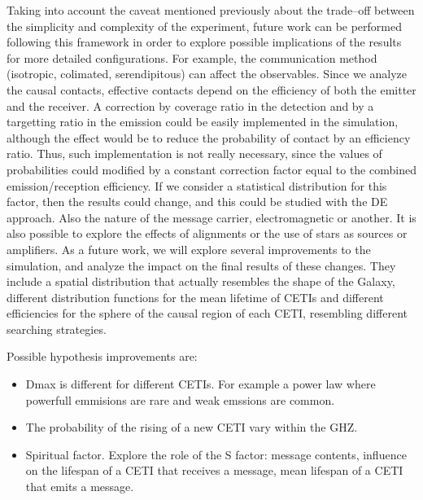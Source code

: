 \documentclass[crop]{CSLB}%
\begin{document}
Taking into account the caveat mentioned previously about the
trade--off between the simplicity and complexity of the experiment,
future work can be performed following this framework in order to
explore possible implications of the results for more detailed
configurations.
%
For example, the communication method (isotropic, colimated,
serendipitous) can affect the observables.
%
Since we analyze the causal contacts, effective contacts depend on the
efficiency of both the emitter and the receiver.
%
A correction by coverage ratio in the detection and by a targetting
ratio in the emission could be easily implemented in the simulation,
although the effect would be to reduce the probability of contact by
an efficiency ratio.
%
Thus, such implementation is not really necessary, since the values of
probabilities could modified by a constant correction factor equal to
the combined emission/reception efficiency.
%
If we consider a statistical distribution for this factor, then the
results could change, and this could be studied with the DE approach.
%
Also the nature of the message carrier, electromagnetic or another.
%
It is also possible to explore the effects of alignments or the use of
stars as sources or amplifiers.
%
%
As a future work, we will explore several improvements to the
simulation, and analyze the impact on the final results of these
changes.
%
They include a spatial distribution that actually resembles the shape
of the Galaxy, different distribution functions for the mean lifetime
of CETIs and different efficiencies for the sphere of the causal
region of each CETI, resembling different searching strategies.


Possible hypothesis improvements are:

\begin{itemize}
   \item Dmax is different for different CETIs.  For example a power
      law where powerfull emmisions are rare and weak emssions are
      common.
   \item The probability of the rising of a new CETI vary within the
      GHZ.
   \item Spiritual factor.  Explore the role of the S factor: message
      contents, influence on the lifespan of a CETI that receives a
      message, mean lifespan of a CETI that emits a message.
\end{itemize} 

 


\end{document}
